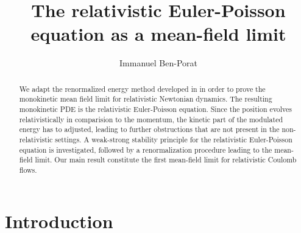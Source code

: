 \documentclass[11pt,reqno]{amsart}
\numberwithin{equation}{section}
\begin{document}
\title{The relativistic Euler-Poisson equation as a mean-field limit}
\author{Immanuel Ben-Porat}
\begin{abstract}
We adapt the renormalized energy method developed in \cite{duerinckx2020mean} in order to prove the monokinetic mean field limit for relativistic Newtonian dynamics. The resulting monokinetic PDE is the relativistic Euler-Poisson equation. Since the position evolves relativistically in comparision to the momentum, the kinetic part of the modulated energy has to adjusted, leading to further obstructions that are not present in the non-relativistic settings. A weak-strong stability principle for the relativistic Euler-Poisson equation is investigated, followed by a renormalization procedure leading to the mean-field limit. Our main result constitute the first mean-field limit for relativistic Coulomb flows.     
\end{abstract}
\maketitle
\section{Introduction}
\end{document}
